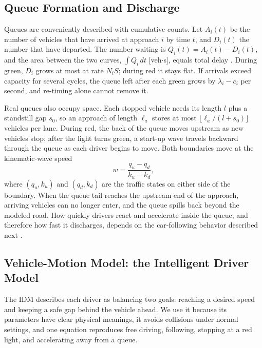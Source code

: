 \documentclass[letterpaper,12pt,conference]{ieeeconf}
\begin{document}
\subsection{Queue Formation and Discharge}

Queues are conveniently described with cumulative counts. Let
$A_i(t)$ be the number of vehicles that have arrived at approach
$i$ by time $t$, and $D_i(t)$ the number that have departed. The
number waiting is $Q_i(t)=A_i(t)-D_i(t)$, and the area between the
two curves, $\int Q_i\,dt$ [veh$\cdot$s], equals total delay
\cite{newell1993}. During green, $D_i$ grows at most at rate
$N_iS$; during red it stays flat. If arrivals exceed capacity for
several cycles, the queue left after each green grows by
$\lambda_i-c_i$ per second, and re-timing alone cannot remove it.

Real queues also occupy space. Each stopped vehicle needs its
length $l$ plus a standstill gap $s_0$, so an approach of length
$\ell_a$ stores at most $\lfloor\ell_a/(l+s_0)\rfloor$ vehicles per
lane. During red, the back of the queue moves upstream as new
vehicles stop; after the light turns green, a start-up wave
travels backward through the queue as each driver begins to move.
Both boundaries move at the kinematic-wave speed
\cite{lighthill1955}
\begin{equation}
w=\frac{q_u-q_d}{k_u-k_d},
\label{eq:shock}
\end{equation}
where $(q_u,k_u)$ and $(q_d,k_d)$ are the traffic states on either
side of the boundary. When the queue tail reaches the upstream end
of the approach, arriving vehicles can no longer enter, and the
queue spills back beyond the modeled road. How quickly drivers
react and accelerate inside the queue, and therefore how fast it
discharges, depends on the car-following behavior described next
\cite{treiber2013}.

\subsection{Vehicle-Motion Model: the Intelligent Driver Model}

The IDM \cite{treiber2000} describes each driver as balancing two
goals: reaching a desired speed and keeping a safe gap behind the
vehicle ahead. We use it because its parameters have clear
physical meanings, it avoids collisions under normal settings,
and one equation reproduces free driving, following, stopping at
a red light, and accelerating away from a queue.
\end{document}
